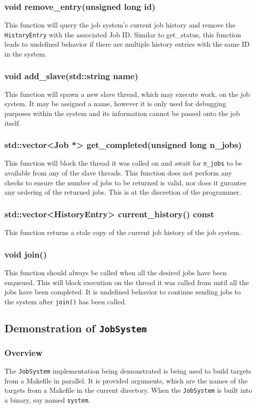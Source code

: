 \documentclass{article}
\begin{document}
		\subsubsection{void remove\_entry(unsigned long id)}
			This function will query the job system's current job history and remove the \texttt{HistoryEntry} with the associated Job ID. Similar to get\_status, this function leads to undefined behavior if there are multiple history entries with the same ID in the system.
		\subsubsection{void add\_slave(std::string name)}
			This function will spawn a new slave thread, which may execute work, on the job system. It may be assigned a name, however it is only used for debugging purposes within the system and its information cannot be passed onto the job itself.
		\subsubsection{std::vector<Job *> get\_completed(unsigned long n\_jobs)}
			This function will block the thread it was called on and await for \texttt{n\_jobs} to be available from any of the slave threads. This function does not perform any checks to ensure the number of jobs to be returned is valid, nor does it gurantee any ordering of the returned jobs. This is at the discretion of the programmer.
		\subsubsection{std::vector<HistoryEntry> current\_history() const}
			This function returns a stale copy of the current job history of the job system.
		\subsubsection{void join()}
			This function should always be called when all the desired jobs have been enqueued. This will block execution on the thread it was called from until all the jobs have been completed. It is undefined behavior to continue sending jobs to the system after \texttt{join()} has been called.
	\subsection{Demonstration of \texttt{JobSystem}}
		\subsubsection{Overview}
			The \texttt{JobSystem} implementation being demonstrated is being used to build targets from a Makefile in parallel. It is provided arguments, which are the names of the targets from a Makefile in the current directory. When the \texttt{JobSystem} is built into a binary, say named \texttt{system}.
			
\end{document}

